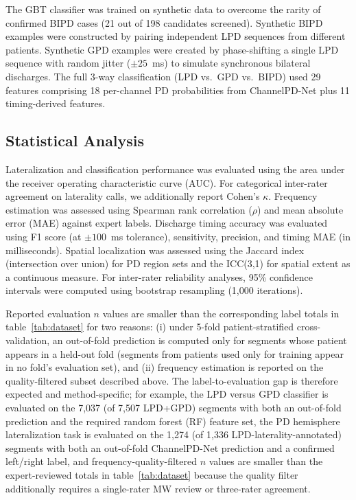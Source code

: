 \documentclass{iopjournal}
\begin{document}
The GBT classifier was trained on synthetic data to overcome the rarity of confirmed BIPD cases (21 out of 198 candidates screened). Synthetic BIPD examples were constructed by pairing independent LPD sequences from different patients. Synthetic GPD examples were created by phase-shifting a single LPD sequence with random jitter ($\pm 25$~ms) to simulate synchronous bilateral discharges. The full 3-way classification (LPD vs.\ GPD vs.\ BIPD) used 29 features comprising 18 per-channel PD probabilities from ChannelPD-Net plus 11 timing-derived features.

\subsection{Statistical Analysis}
\label{sec:statistics}

Lateralization and classification performance was evaluated using the area under the receiver operating characteristic curve (AUC). For categorical inter-rater agreement on laterality calls, we additionally report Cohen's $\kappa$. Frequency estimation was assessed using Spearman rank correlation ($\rho$) and mean absolute error (MAE) against expert labels. Discharge timing accuracy was evaluated using F1 score (at $\pm 100$~ms tolerance), sensitivity, precision, and timing MAE (in milliseconds). Spatial localization was assessed using the Jaccard index (intersection over union) for PD region sets and the ICC(3,1) for spatial extent as a continuous measure. For inter-rater reliability analyses, 95\% confidence intervals were computed using bootstrap resampling (1,000 iterations).

Reported evaluation $n$ values are smaller than the corresponding label totals in table~\ref{tab:dataset} for two reasons: (i) under 5-fold patient-stratified cross-validation, an out-of-fold prediction is computed only for segments whose patient appears in a held-out fold (segments from patients used only for training appear in no fold's evaluation set), and (ii) frequency estimation is reported on the quality-filtered subset described above. The label-to-evaluation gap is therefore expected and method-specific; for example, the LPD versus GPD classifier is evaluated on the 7,037 (of 7,507 LPD+GPD) segments with both an out-of-fold prediction and the required random forest (RF) feature set, the PD hemisphere lateralization task is evaluated on the 1,274 (of 1,336 LPD-laterality-annotated) segments with both an out-of-fold ChannelPD-Net prediction and a confirmed left/right label, and frequency-quality-filtered $n$ values are smaller than the expert-reviewed totals in table~\ref{tab:dataset} because the quality filter additionally requires a single-rater MW review or three-rater agreement.
\end{document}
